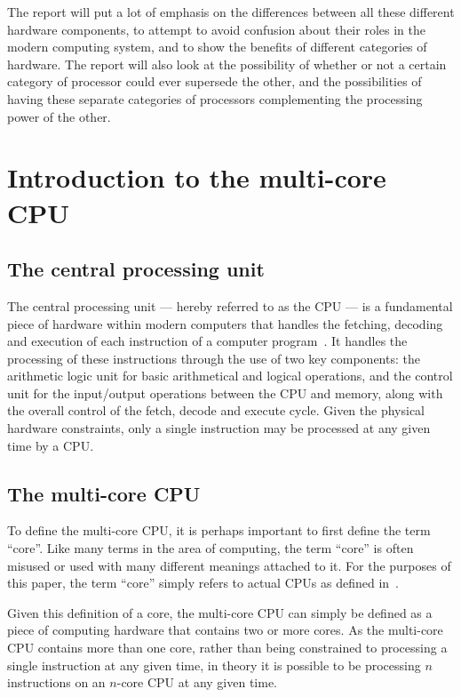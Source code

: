 \documentclass[a4paper,11pt]{article}
\begin{document}
The report will put a lot of emphasis on the differences between all these different hardware components, to attempt to
avoid confusion about their roles in the modern computing system, and to show the benefits of different categories of
hardware. The report will also look at the possibility of whether or not a certain category of processor could ever
supersede the other, and the possibilities of having these separate categories of processors complementing the
processing power of the other.


\newpage


\section{Introduction to the multi-core CPU} %
\label{sec:introduction_to_the_multi_core_cpu}

\subsection{The central processing unit} %
\label{sub:the_central_processing_unit}
The central processing unit --- hereby referred to as the CPU --- is a fundamental piece of hardware within modern computers that handles
the fetching, decoding and execution of each instruction of a computer program~\cite{web:CPUWiki}. It handles the processing
of these instructions through the use of two key components: the arithmetic logic unit for basic arithmetical and logical
operations, and the control unit for the input/output
operations between the CPU and memory, along with the overall control of the fetch, decode and execute cycle. Given the
physical hardware constraints, only a single instruction may be processed at any given time by a CPU.

\subsection{The multi-core CPU} %
\label{sub:the_multi_core_cpu}
To define the multi-core CPU, it is perhaps important to first define the term ``core''. Like many terms in the area of computing,
the term ``core'' is often misused or used with many different meanings attached to it. For the purposes of this paper, the
term ``core'' simply refers to actual CPUs as defined in~.

Given this definition of a core, the multi-core CPU can simply be defined as a piece of computing hardware that contains
two or more cores. As the multi-core CPU contains more than one core, rather than being constrained to processing a single
instruction at any given time, in theory it is possible to be processing $n$ instructions on an $n$-core CPU at any given time.
\end{document}

